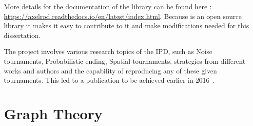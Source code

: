 More details for the documentation of the library can be found here :
\url{https://axelrod.readthedocs.io/en/latest/index.html}.
Because is an open source library it makes it easy to contribute to it and
make modifications needed for this dissertation.

The project involves various research topics of the IPD, such as Noise tournaments,
Probabilistic ending, Spatial tournaments, strategies from different works and
authors and the capability of reproducing any of these given tournaments. This
led to a publication to be achieved earlier in 2016~\cite{Knight2016}.

\section{Graph Theory}
